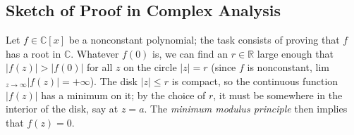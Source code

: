 \subsection{Sketch of Proof in Complex Analysis}\label{complexproofofFOA}
Let $f \in \mathbb{C}[x]$ be a nonconstant polynomial; the task consists of proving that $f$ has a root in $\mathbb{C}$. Whatever $f(0)$ is,
we can find an $r \in \mathbb{R}$ large enough that $|f(z)| > |f(0)|$ for all $z$ on the circle $|z| = r$ (since $f$ is nonconstant, lim$_{z \rightarrow \infty}|f(z)| = + \infty$).
The disk $|z| \leq r$ is compact, so the continuous function $|f(z)|$ has a minimum on it; by the choice of $r$, it must be somewhere in the interior of the disk, say at $z = a$.
The \emph{minimum modulus principle} then implies that $f(z) = 0$.
